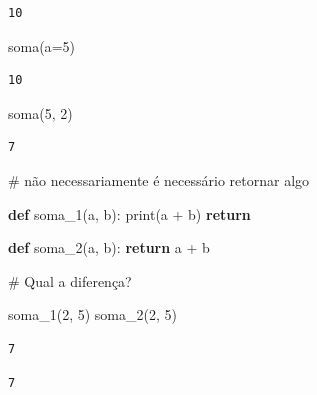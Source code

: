 \documentclass[
  letterpaper,
  DIV=11,
  numbers=noendperiod]{scrreprt}
\newenvironment{Shaded}{\begin{snugshade}}{\end{snugshade}}
\newcommand{\BuiltInTok}[1]{\textcolor[rgb]{0.00,0.23,0.31}{#1}}
\newcommand{\CommentTok}[1]{\textcolor[rgb]{0.37,0.37,0.37}{#1}}
\newcommand{\ControlFlowTok}[1]{\textcolor[rgb]{0.00,0.23,0.31}{\textbf{#1}}}
\newcommand{\DecValTok}[1]{\textcolor[rgb]{0.68,0.00,0.00}{#1}}
\newcommand{\KeywordTok}[1]{\textcolor[rgb]{0.00,0.23,0.31}{\textbf{#1}}}
\newcommand{\NormalTok}[1]{\textcolor[rgb]{0.00,0.23,0.31}{#1}}
\newcommand{\OperatorTok}[1]{\textcolor[rgb]{0.37,0.37,0.37}{#1}}
\begin{document}
\begin{verbatim}
10
\end{verbatim}

\begin{Shaded}
\begin{Highlighting}[]
\NormalTok{soma(a}\OperatorTok{=}\DecValTok{5}\NormalTok{)}
\end{Highlighting}
\end{Shaded}

\begin{verbatim}
10
\end{verbatim}

\begin{Shaded}
\begin{Highlighting}[]
\NormalTok{soma(}\DecValTok{5}\NormalTok{, }\DecValTok{2}\NormalTok{)}
\end{Highlighting}
\end{Shaded}

\begin{verbatim}
7
\end{verbatim}

\begin{Shaded}
\begin{Highlighting}[]
\CommentTok{\# não necessariamente é necessário retornar algo}

\KeywordTok{def}\NormalTok{ soma\_1(a, b):}
    \BuiltInTok{print}\NormalTok{(a }\OperatorTok{+}\NormalTok{ b)}
    \ControlFlowTok{return}

\KeywordTok{def}\NormalTok{ soma\_2(a, b):}
    \ControlFlowTok{return}\NormalTok{ a }\OperatorTok{+}\NormalTok{ b}
\end{Highlighting}
\end{Shaded}

\begin{Shaded}
\begin{Highlighting}[]
\CommentTok{\# Qual a diferença?}

\NormalTok{soma\_1(}\DecValTok{2}\NormalTok{, }\DecValTok{5}\NormalTok{)}
\NormalTok{soma\_2(}\DecValTok{2}\NormalTok{, }\DecValTok{5}\NormalTok{)}
\end{Highlighting}
\end{Shaded}

\begin{verbatim}
7
\end{verbatim}

\begin{verbatim}
7
\end{verbatim}
\end{document}
